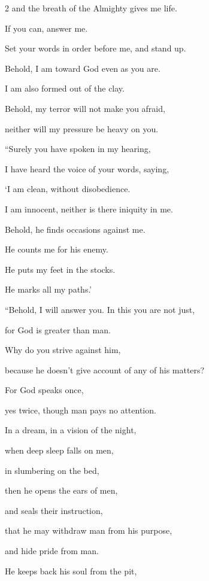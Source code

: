\begin{multicols}{2}
	and the breath of the Almighty gives me life.
	
	\myverse{}If you can, answer me.
	
	Set your words in order before me, and stand up.
	
	\myverse{}Behold, I am toward God even as you are.
	
	I am also formed out of the clay.
	
	\myverse{}Behold, my terror will not make you afraid,
	
	neither will my pressure be heavy on you.
	
		\vspace{\baselineskip}
	
	\myverse{}“Surely you have spoken in my hearing,
	
	I have heard the voice of your words, saying,
	
	\myverse{}‘I am clean, without disobedience.
	
	I am innocent, neither is there iniquity in me.
	
	\myverse{}Behold, he finds occasions against me.
	
	He counts me for his enemy.
	
	\myverse{}He puts my feet in the stocks.
	
	He marks all my paths.’
	
		\vspace{\baselineskip}
	
	\myverse{}“Behold, I will answer you. In this you are not just,
	
	for God is greater than man.
	
	\myverse{}Why do you strive against him,
	
	because he doesn’t give account of any of his matters?
	
	\myverse{}For God speaks once,
	
	yes twice, though man pays no attention.
	
	\myverse{}In a dream, in a vision of the night,
	
	when deep sleep falls on men,
	
	in slumbering on the bed,
	
	\myverse{}then he opens the ears of men,
	
	and seals their instruction,
	
	\myverse{}that he may withdraw man from his purpose,
	
	and hide pride from man.
	
	\myverse{}He keeps back his soul from the pit,
	

\end{multicols}
